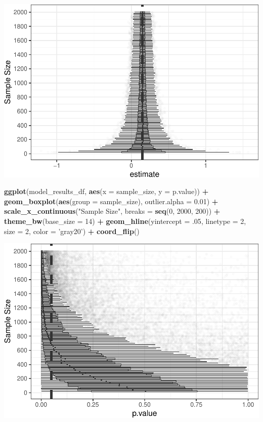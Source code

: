 \documentclass[man]{apa6}
\newenvironment{Shaded}{\begin{snugshade}}{\end{snugshade}}
\newcommand{\DataTypeTok}[1]{\textcolor[rgb]{0.13,0.29,0.53}{#1}}
\newcommand{\DecValTok}[1]{\textcolor[rgb]{0.00,0.00,0.81}{#1}}
\newcommand{\FloatTok}[1]{\textcolor[rgb]{0.00,0.00,0.81}{#1}}
\newcommand{\KeywordTok}[1]{\textcolor[rgb]{0.13,0.29,0.53}{\textbf{#1}}}
\newcommand{\NormalTok}[1]{#1}
\newcommand{\OperatorTok}[1]{\textcolor[rgb]{0.81,0.36,0.00}{\textbf{#1}}}
\newcommand{\StringTok}[1]{\textcolor[rgb]{0.31,0.60,0.02}{#1}}
\begin{document}
\includegraphics{power_simulation_files/figure-latex/estimate-figure-1.pdf}

\begin{Shaded}
\begin{Highlighting}[]
\KeywordTok{ggplot}\NormalTok{(model_results_df, }\KeywordTok{aes}\NormalTok{(}\DataTypeTok{x =}\NormalTok{ sample_size, }\DataTypeTok{y =}\NormalTok{ p.value)) }\OperatorTok{+}\StringTok{ }
\StringTok{  }\KeywordTok{geom_boxplot}\NormalTok{(}\KeywordTok{aes}\NormalTok{(}\DataTypeTok{group =}\NormalTok{ sample_size), }\DataTypeTok{outlier.alpha =} \FloatTok{0.01}\NormalTok{) }\OperatorTok{+}
\StringTok{  }\KeywordTok{scale_x_continuous}\NormalTok{(}\StringTok{"Sample Size"}\NormalTok{, }\DataTypeTok{breaks =} \KeywordTok{seq}\NormalTok{(}\DecValTok{0}\NormalTok{, }\DecValTok{2000}\NormalTok{, }\DecValTok{200}\NormalTok{)) }\OperatorTok{+}
\StringTok{  }\KeywordTok{theme_bw}\NormalTok{(}\DataTypeTok{base_size =} \DecValTok{14}\NormalTok{) }\OperatorTok{+}
\StringTok{  }\KeywordTok{geom_hline}\NormalTok{(}\DataTypeTok{yintercept =} \FloatTok{.05}\NormalTok{, }\DataTypeTok{linetype =} \DecValTok{2}\NormalTok{, }\DataTypeTok{size =} \DecValTok{2}\NormalTok{, }\DataTypeTok{color =} \StringTok{'gray20'}\NormalTok{) }\OperatorTok{+}
\StringTok{  }\KeywordTok{coord_flip}\NormalTok{()}
\end{Highlighting}
\end{Shaded}

\includegraphics{power_simulation_files/figure-latex/p-value-figure-1.pdf}
\end{document}
